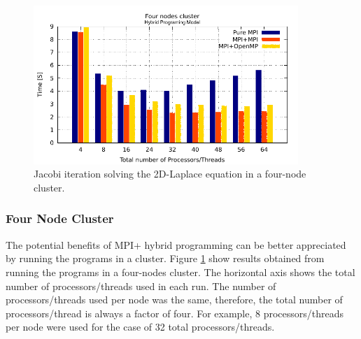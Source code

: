 \begin{figure}[h!]
    \centering
    \includegraphics[width=100mm]{Plots/HybridProgramming/cluster.pdf}
    \caption{Jacobi iteration solving the 2D-Laplace equation in a four-node cluster.}
    \label{fig:HybridCluster}
\end{figure}

\subsubsection*{Four Node Cluster}

The potential benefits of MPI+ hybrid programming can be better appreciated by running the programs in a cluster. Figure \ref{fig:HybridCluster} show results obtained from running the programs in a four-nodes cluster. The horizontal axis shows the total number of processors/threads used in each run. The number of processors/threads used per node was the same, therefore, the total number of processors/thread is always a factor of four. For example, 8 processors/threads per node were used for the case of 32 total processors/threads. %

